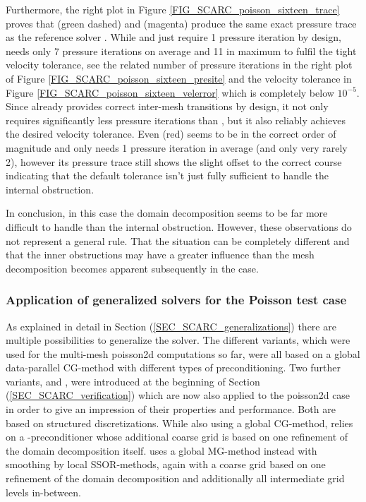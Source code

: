 Furthermore, the right plot in Figure \ref{FIG_SCARC_poisson_sixteen_trace} proves that \uscarc{} (green dashed) and \scarctight{} (magenta) produce the same exact pressure trace as the reference solver \uglmat{}. While \uglmat{} and \uscarc{} just require 1 pressure iteration by design, \scarctight{} needs only 7 pressure iterations on average and 11 in maximum to fulfil the tight velocity tolerance, see the related number of pressure iterations in the right plot of Figure \ref{FIG_SCARC_poisson_sixteen_presite} and the  velocity tolerance  in Figure \ref{FIG_SCARC_poisson_sixteen_velerror} which is completely below $10^{-5}$.
%
Since \scarctight{} already provides correct inter-mesh transitions by design, it not only requires significantly less pressure iterations than \ffttight{}, but it also reliably achieves the desired velocity tolerance.
Even \scarcdefault{} (red) seems to be in the correct order of magnitude and only needs 1 pressure iteration in average (and only very rarely 2), however its pressure trace still shows the slight offset to the correct course indicating that the default tolerance isn't just fully sufficient to handle the internal obstruction.

In conclusion, in this case the domain decomposition seems to be far more difficult to handle than the internal obstruction.
However, these observations do not represent a general rule. That the situation can be completely different and that the inner obstructions may have a greater influence than the mesh decomposition becomes apparent subsequently in the {} case.


\subsubsection{Application of generalized \scarc{} solvers for the Poisson test case}
\label{SEC_SCARC_poisson_generalizations}

As explained in detail in Section (\ref{SEC_SCARC_generalizations}) there are multiple possibilities to generalize the \scarc{} solver. 
The different \scarc{} variants, which were used for the multi-mesh {\ct poisson2d} computations so far, were all 
based on a global data-parallel CG-method with different types of preconditioning. 
Two further variants, \scarctwolevel{} and \scarcmultigrid{}, were introduced at the beginning of Section (\ref{SEC_SCARC_verification})
which are now also applied to the {\ct poisson2d} case in order to give an impression of their properties and performance. 
Both are based on structured discretizations. While also using a global CG-method, \scarctwolevel{} relies on a \tls{}-preconditioner whose additional coarse grid is based on one refinement of the domain decomposition itself. \scarcmultigrid{} uses a global MG-method instead with smoothing by local SSOR-methods, again with a coarse grid based on one refinement of the domain decomposition and additionally all intermediate grid levels in-between.

